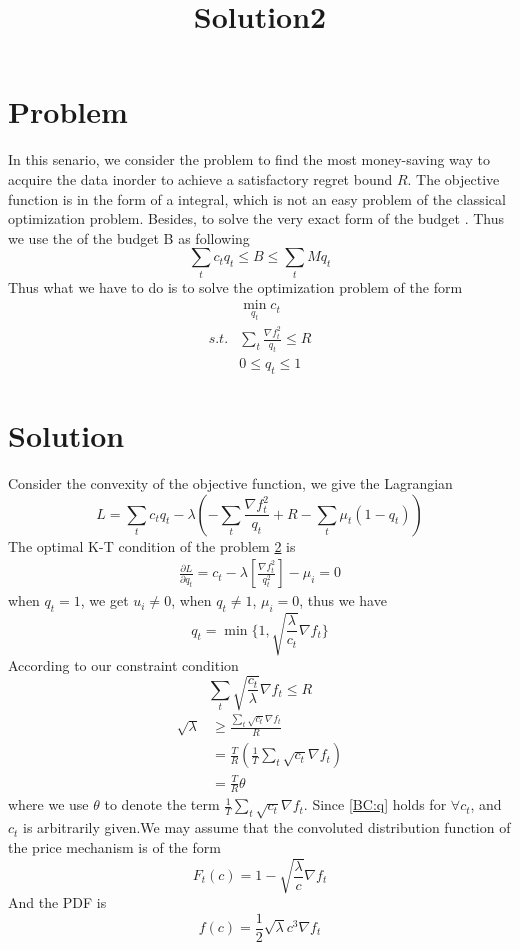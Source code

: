 \documentclass{article}
\begin{document}
\title{Solution2}
\maketitle
\section{Problem}
In this senario, we consider the problem to find the most money-saving way to acquire the data inorder to achieve a satisfactory regret bound $R$. The objective function is in the form of a integral, which is not an easy problem of the classical optimization problem. Besides, to solve the very exact form of the budget . Thus we use the of the budget B as following
\begin{equation}
\sum_t c_t q_t \leq B \leq \sum_t Mq_t
\end{equation}
Thus what we have to do is to solve the optimization problem of the form
\begin{align}
&\min_{q_t} c_t\\
s.t. &\sum_t \frac{\nabla f_t^2}{q_t}\leq R\\
	&0\leq q_t \leq 1
\end{align}
\section{Solution}
Consider the convexity of the objective function, we give the Lagrangian
\begin{equation}
L=\sum_t c_t q_t -\lambda(-\sum_t\frac{\nabla f_t^2}{q_t}+R-\sum_t\mu_t(1-q_t))
\end{equation}
The optimal K-T condition of the problem \ref{} is 
\begin{align}
\frac{\partial L}{\partial q_t}=c_t-\lambda[\frac{\nabla f_t^2}{q_t^2}]-\mu_i=0
\end{align}
when $q_t=1$, we get $u_i\neq 0$, when $q_t\neq 1$, $\mu_i=0$, thus we have
\begin{equation}\label{BC:q}
q_t=\min\{1,\sqrt{\frac{\lambda}{c_t}}\nabla f_t\}
\end{equation}
According to our constraint condition
\begin{equation}
\sum_t \sqrt{\frac{c_t}{\lambda}}\nabla f_t\leq R
\end{equation}
\begin{align}
\sqrt{\lambda}&\geq\frac{\sum_t \sqrt{c_t}\nabla f_t}{R}\\
& =\frac{T}{R}(\frac{1}{T}\sum_t\sqrt{c_t}\nabla f_t)\\
& =\frac{T}{R}\theta
\end{align}
where we use $\theta$ to denote the term $\frac{1}{T}\sum_t\sqrt{c_t}\nabla f_t$.
Since \ref{BC:q} holds for $\forall c_t$, and $c_t$ is arbitrarily given.We may assume that the convoluted distribution function of the price mechanism is of the form 
\begin{equation}
F_t(c)=1-\sqrt{\frac{\lambda}{c}}\nabla f_t
\end{equation}
And the PDF is 
\begin{equation}
f(c)=\frac{1}{2}\sqrt{\lambda}{c^3}\nabla f_t
\end{equation}
\end{document}
